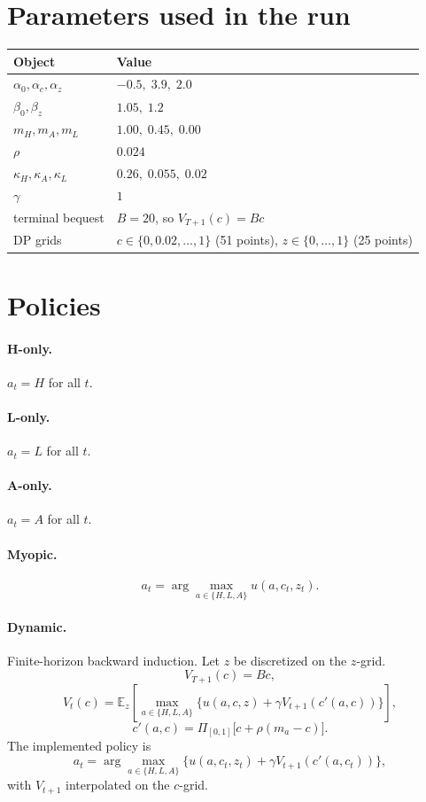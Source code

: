 \documentclass[11pt]{article}
\begin{document}
\section{Parameters used in the run}
\begin{center}
\begin{tabular}{@{}ll@{}}
\toprule
Object & Value \\
\midrule
\(\alpha_0,\alpha_c,\alpha_z\) & \(-0.5,\; 3.9,\; 2.0\) \\
\(\beta_0,\beta_z\) & \(1.05,\; 1.2\) \\
\(m_H,m_A,m_L\) & \(1.00,\; 0.45,\; 0.00\) \\
\(\rho\) & \(0.024\) \\
\(\kappa_H,\kappa_A,\kappa_L\) & \(0.26,\; 0.055,\; 0.02\) \\
\(\gamma\) & \(1\) \\
terminal bequest & \(B=20\), so \(V_{T+1}(c)=Bc\) \\
DP grids & \(c\in\{0,0.02,\ldots,1\}\) (51 points), \(z\in\{0,\ldots,1\}\) (25 points) \\
\bottomrule
\end{tabular}
\end{center}

\section{Policies}
\paragraph{H-only.} \(a_t=H\) for all \(t\).
\paragraph{L-only.} \(a_t=L\) for all \(t\).
\paragraph{A-only.} \(a_t=A\) for all \(t\).
\paragraph{Myopic.}
\[
a_t=\arg\max_{a\in\{H,L,A\}} u(a,c_t,z_t).
\]
\paragraph{Dynamic.}
Finite-horizon backward induction. Let \(z\) be discretized on the \(z\)-grid.
\[
V_{T+1}(c)=Bc,
\]
\[
V_t(c)
=
\mathbb{E}_z
\left[
\max_{a\in\{H,L,A\}}
\bigl\{
u(a,c,z)+\gamma V_{t+1}(c'(a,c))
\bigr\}
\right],
\]
\[
c'(a,c)=\Pi_{[0,1]}\bigl[c+\rho(m_a-c)\bigr].
\]
The implemented policy is
\[
a_t
=
\arg\max_{a\in\{H,L,A\}}
\bigl\{
u(a,c_t,z_t)+\gamma V_{t+1}(c'(a,c_t))
\bigr\},
\]
with \(V_{t+1}\) interpolated on the \(c\)-grid.
\end{document}

